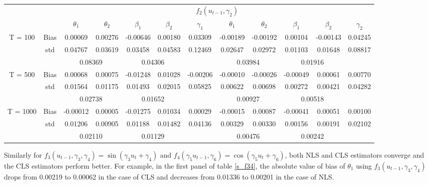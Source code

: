 \documentclass[a4paper,12pt,times,numbered,print,index]{report}
\numberwithin{equation}{section}
\begin{document}
\begin{table}[htbp]
\begin{adjustbox}{max width=\textwidth}
\begin{tabular}{cccccccccccc}
    \midrule
    &       & \multicolumn{10}{c}{$f_2 (u_{t-1}, \gamma_2)$}                \\
    &       & $\theta_1$ & $\theta_2$ & $\beta_1$ & $\beta_2$ & $\gamma_1$ & $\theta_1$ & $\theta_2$ & $\beta_1$ & $\beta_2$ & $\gamma_2$ \\
    \midrule
    \multirow{3}[1]{*}{T = 100} & Bias  & 0.00069 & 0.00276 & -0.00646 & 0.00180 & 0.03309 & -0.00189 & -0.00192 & 0.00104 & -0.00143 & 0.04245 \\
          & std   & 0.04767 & 0.03619 & 0.03458 & 0.04583 & 0.12469 & 0.02647 & 0.02972 & 0.01103 & 0.01648 & 0.08817 \\
          &       & \multicolumn{2}{c}{0.08369} & \multicolumn{2}{c}{0.04306} &       & \multicolumn{2}{c}{0.03984} & \multicolumn{2}{c}{\textcolor[rgb]{ .329,  .51,  .208}{0.01916}} &  \\
    \multirow{3}[0]{*}{T = 500} & Bias  & 0.00068 & 0.00075 & -0.01248 & 0.01028 & -0.00206 & -0.00010 & -0.00026 & -0.00049 & 0.00061 & 0.00770 \\
          & std   & 0.01564 & 0.01175 & 0.01493 & 0.02015 & 0.05825 & 0.00622 & 0.00698 & 0.00272 & 0.00421 & 0.04282 \\
          &       & \multicolumn{2}{c}{0.02738} & \multicolumn{2}{c}{0.01652} &       & \multicolumn{2}{c}{0.00927} & \multicolumn{2}{c}{\textcolor[rgb]{ .329,  .51,  .208}{0.00518}} &  \\
    \multirow{3}[1]{*}{T = 1000} & Bias  & -0.00012 & 0.00005 & -0.01275 & 0.01034 & 0.00029 & -0.00015 & 0.00087 & -0.00041 & 0.00051 & 0.00100 \\
          & std   & 0.01206 & 0.00905 & 0.01188 & 0.01482 & 0.04136 & 0.00329 & 0.00330 & 0.00156 & 0.00191 & 0.02102 \\
          &       & \multicolumn{2}{c}{0.02110} & \multicolumn{2}{c}{0.01129} &       & \multicolumn{2}{c}{0.00476} & \multicolumn{2}{c}{\textcolor[rgb]{ .329,  .51,  .208}{0.00242}} &  \\
    \bottomrule
    \bottomrule
    \end{tabular}%
    \end{adjustbox}
  \label{s_f12}%
\end{table}%


Similarly for $f_3(u_{t-1},\gamma_3, \gamma_4) = \sin(\gamma_3 u_t+\gamma_{4})$ and $f_4(\gamma_5 u_{t-1}, \gamma_6) = \cos(\gamma_5 u_t+\gamma_{6})$, both NLS and CLS estimators converge and the CLS estimators perform better. For example, in the first panel of table \ref{s_f34}, the absolute value of bias of $\theta_1$ using $f_3(u_{t-1}, \gamma_3, \gamma_4)$ drops from 0.00219 to 0.00062 in the case of CLS and decreases from 0.01336 to 0.00201 in the case of NLS. 
\end{document}
